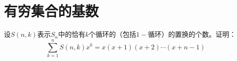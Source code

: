 \chapter{有穷集合的基数}
\begin{Ex}
  设$S(n,k)$表示$S_n$中的恰有$k$个循环的（包括$1-$循环）的置换的个数。证明：
  \[\sum_{k=1}^nS(n,k)x^k = x(x+1)(x+2)\cdots(x+n-1)\]
\end{Ex}
